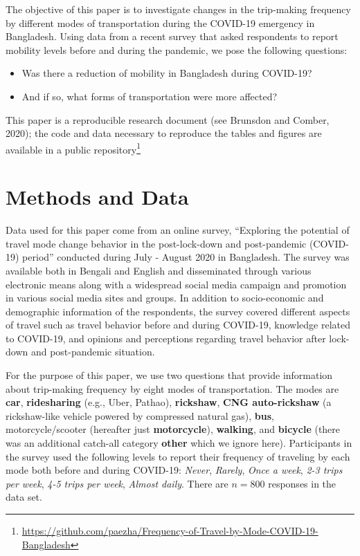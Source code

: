 \documentclass[]{elsarticle} %
\providecommand{\tightlist}{%
  \setlength{\itemsep}{0pt}\setlength{\parskip}{0pt}}
\begin{document}
The objective of this paper is to investigate changes in the trip-making
frequency by different modes of transportation during the COVID-19
emergency in Bangladesh. Using data from a recent survey that asked
respondents to report mobility levels before and during the pandemic, we
pose the following questions:

\begin{itemize}
\tightlist
\item
  Was there a reduction of mobility in Bangladesh during COVID-19?
\item
  And if so, what forms of transportation were more affected?
\end{itemize}

This paper is a reproducible research document (see Brunsdon and Comber,
2020); the code and data necessary to reproduce the tables and figures
are available in a public
repository\footnote{\url{https://github.com/paezha/Frequency-of-Travel-by-Mode-COVID-19-Bangladesh}}

\hypertarget{methods-and-data}{%
\section{Methods and Data}\label{methods-and-data}}

Data used for this paper come from an online survey, ``Exploring the
potential of travel mode change behavior in the post-lock-down and
post-pandemic (COVID-19) period'' conducted during July - August 2020 in
Bangladesh. The survey was available both in Bengali and English and
disseminated through various electronic means along with a widespread
social media campaign and promotion in various social media sites and
groups. In addition to socio-economic and demographic information of the
respondents, the survey covered different aspects of travel such as
travel behavior before and during COVID-19, knowledge related to
COVID-19, and opinions and perceptions regarding travel behavior after
lock-down and post-pandemic situation.

For the purpose of this paper, we use two questions that provide
information about trip-making frequency by eight modes of
transportation. The modes are \textbf{car}, \textbf{ridesharing} (e.g.,
Uber, Pathao), \textbf{rickshaw}, \textbf{CNG auto-rickshaw} (a
rickshaw-like vehicle powered by compressed natural gas), \textbf{bus},
motorcycle/scooter (hereafter just \textbf{motorcycle}),
\textbf{walking}, and \textbf{bicycle} (there was an additional
catch-all category \textbf{other} which we ignore here). Participants in
the survey used the following levels to report their frequency of
traveling by each mode both before and during COVID-19: \emph{Never},
\emph{Rarely}, \emph{Once a week}, \emph{2-3 trips per week}, \emph{4-5
trips per week}, \emph{Almost daily}. There are \(n=800\) responses in
the data set.
\end{document}
